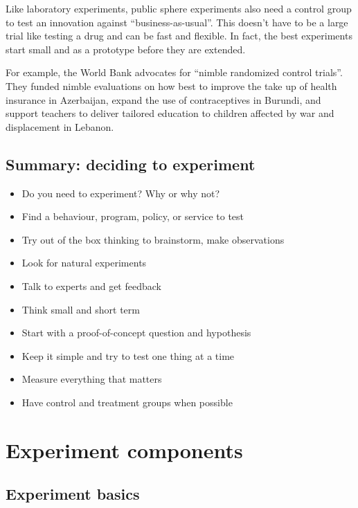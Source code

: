 \documentclass[openany]{book}
\providecommand{\tightlist}{%
  \setlength{\itemsep}{0pt}\setlength{\parskip}{0pt}}
\begin{document}
Like laboratory experiments, public sphere experiments also need a control group to test an innovation against ``business-as-usual''. This doesn't have to be a large trial like testing a drug and can be fast and flexible. In fact, the best experiments start small and as a prototype before they are extended.

For example, the World Bank advocates for ``nimble randomized control trials''. They funded nimble evaluations on how best to improve the take up of health insurance in Azerbaijan, expand the use of contraceptives in Burundi, and support teachers to deliver tailored education to children affected by war and displacement in Lebanon.

\hypertarget{summary-deciding-to-experiment}{%
\section{Summary: deciding to experiment}\label{summary-deciding-to-experiment}}

\begin{itemize}
\tightlist
\item
  Do you need to experiment? Why or why not?
\item
  Find a behaviour, program, policy, or service to test
\item
  Try out of the box thinking to brainstorm, make observations
\item
  Look for natural experiments
\item
  Talk to experts and get feedback
\item
  Think small and short term
\item
  Start with a proof-of-concept question and hypothesis
\item
  Keep it simple and try to test one thing at a time
\item
  Measure everything that matters
\item
  Have control and treatment groups when possible
\end{itemize}

\hypertarget{experiment-components}{%
\chapter{Experiment components}\label{experiment-components}}

\hypertarget{experiment-basics}{%
\section{Experiment basics}\label{experiment-basics}}
\end{document}
